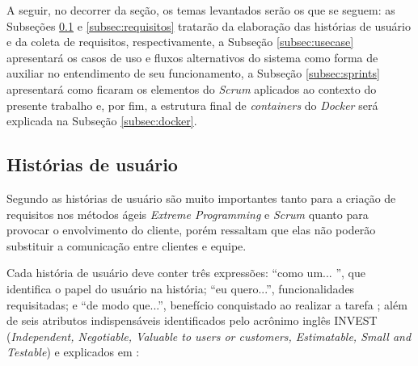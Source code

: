 A seguir, no decorrer da seção, os temas levantados serão os que se seguem: as Subseções \ref{subsec:historias} e \ref{subsec:requisitos} tratarão da elaboração das histórias de usuário e da coleta de requisitos, respectivamente, a Subseção \ref{subsec:usecase} apresentará os casos de uso e fluxos alternativos do sistema como forma de auxiliar no entendimento de seu funcionamento, a Subseção \ref{subsec:sprints} apresentará como ficaram os elementos do \textit{Scrum} aplicados ao contexto do presente trabalho e, por fim, a estrutura final de \textit{containers} do \textit{Docker} será explicada na Subseção \ref{subsec:docker}.

\hspace{2.5cm}
\subsection{Histórias de usuário}
\label{subsec:historias}
\hspace{2.5cm}

Segundo  as histórias de usuário são muito importantes tanto para a criação de requisitos nos métodos ágeis \textit{Extreme Programming} e \textit{Scrum} quanto para provocar o envolvimento do cliente, porém  ressaltam que elas não poderão substituir a comunicação entre clientes e equipe.

Cada história de usuário deve conter três expressões: ``como um... '', que identifica o papel do usuário na história; ``eu quero...'', funcionalidades requisitadas; e ``de modo que...'', benefício conquistado ao realizar a tarefa ; além de seis atributos indispensáveis identificados pelo acrônimo inglês INVEST (\textit{Independent, Negotiable, Valuable to users or customers, Estimatable, Small and Testable}) \cite{cohn2004user} e explicados em :

